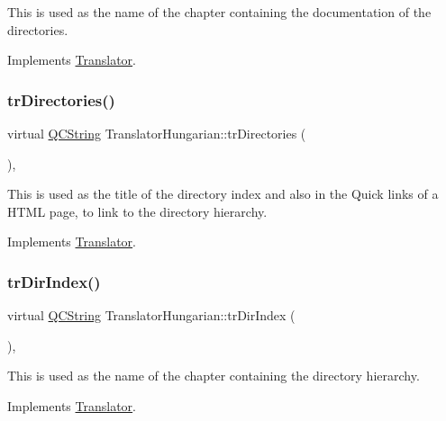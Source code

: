 This is used as the name of the chapter containing the documentation of the directories. 

Implements \mbox{\hyperlink{class_translator}{Translator}}.

\mbox{\label{class_translator_hungarian_ac19a7d4a46a93f69c01e9b207e3a4e9f}} 
\subsubsection{\texorpdfstring{trDirectories()}{trDirectories()}}
{\footnotesize\ttfamily virtual \mbox{\hyperlink{class_q_c_string}{Q\+C\+String}} Translator\+Hungarian\+::tr\+Directories (\begin{DoxyParamCaption}{ }\end{DoxyParamCaption})\hspace{0.3cm}{\ttfamily [inline]}, {\ttfamily [virtual]}}

This is used as the title of the directory index and also in the Quick links of a H\+T\+ML page, to link to the directory hierarchy. 

Implements \mbox{\hyperlink{class_translator}{Translator}}.

\mbox{\label{class_translator_hungarian_a9e8005c68c3da52b1063963e04ac0a51}} 
\subsubsection{\texorpdfstring{trDirIndex()}{trDirIndex()}}
{\footnotesize\ttfamily virtual \mbox{\hyperlink{class_q_c_string}{Q\+C\+String}} Translator\+Hungarian\+::tr\+Dir\+Index (\begin{DoxyParamCaption}{ }\end{DoxyParamCaption})\hspace{0.3cm}{\ttfamily [inline]}, {\ttfamily [virtual]}}

This is used as the name of the chapter containing the directory hierarchy. 

Implements \mbox{\hyperlink{class_translator}{Translator}}.

\mbox{\label{class_translator_hungarian_ae228ae74c0bab192878d1dc4354bfbbe}} 
